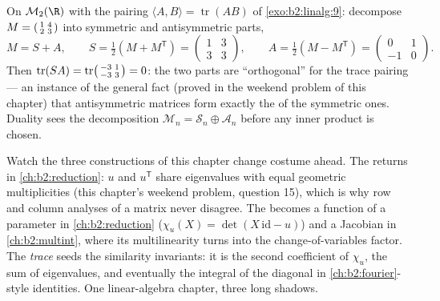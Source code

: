 \begin{example}\label{ex:b2:linalg:tracepairing}
On $\mathcal{M}_2(\R)$ with the pairing $\langle A, B\rangle =
\operatorname{tr}(AB)$ of \cref{exo:b2:linalg:9}: decompose $M =
\begin{psmallmatrix}1 & 4\\ 2 & 3\end{psmallmatrix}$ into
symmetric and antisymmetric parts,
\[
M = S + A, \qquad
S = \tfrac12(M + M^{\mathsf T}) =
\begin{pmatrix}1 & 3\\ 3 & 3\end{pmatrix},
\qquad
A = \tfrac12(M - M^{\mathsf T}) =
\begin{pmatrix}0 & 1\\ -1 & 0\end{pmatrix}.
\]
Then $\operatorname{tr}(SA) = \operatorname{tr}
\begin{psmallmatrix}-3 & 1\\ -3 & 3\end{psmallmatrix} = 0$: the
two parts are ``orthogonal'' for the trace pairing --- an
instance of the general fact (proved in the weekend problem of
this chapter) that antisymmetric matrices form exactly the
 of the symmetric ones. Duality sees the
decomposition $\mathcal{M}_n = \mathcal{S}_n \oplus
\mathcal{A}_n$ before any inner product is chosen.
\end{example}

\begin{remark}\label{rem:b2:linalg:perspectives}
Watch the three constructions of this chapter change costume
ahead. The \emph{} returns in
\cref{ch:b2:reduction}: $u$ and $u^{\mathsf T}$ share
eigenvalues with equal geometric multiplicities (this chapter's
weekend problem, question 15), which is why row and column
analyses of a matrix never disagree. The \emph{}
becomes a function of a parameter in \cref{ch:b2:reduction}
($\chi_u(X) = \det(X\,\mathrm{id} - u)$) and a Jacobian in
\cref{ch:b2:multint}, where its multilinearity turns into the
change-of-variables factor. The \emph{trace} seeds the
similarity invariants: it is the second coefficient of
$\chi_u$, the sum of eigenvalues, and eventually the integral
of the diagonal in \cref{ch:b2:fourier}-style identities. One
linear-algebra chapter, three long shadows.
\end{remark}

